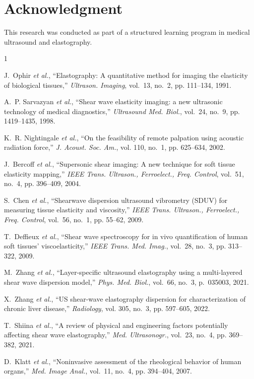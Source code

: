 \documentclass[journal,twoside,a4paper]{IEEEtran}
\begin{document}
\section*{Acknowledgment}

This research was conducted as part of a structured learning program 
in medical ultrasound and elastography.

\begin{thebibliography}{1}

J.~Ophir \textit{et al.}, ``Elastography: A quantitative method for 
imaging the elasticity of biological tissues,'' \emph{Ultrason. Imaging}, 
vol.~13, no.~2, pp. 111--134, 1991.

A.~P. Sarvazyan \textit{et al.}, ``Shear wave elasticity imaging: 
a new ultrasonic technology of medical diagnostics,'' 
\emph{Ultrasound Med. Biol.}, vol.~24, no.~9, pp. 1419--1435, 1998.

K.~R. Nightingale \textit{et al.}, ``On the feasibility of remote 
palpation using acoustic radiation force,'' 
\emph{J. Acoust. Soc. Am.}, vol. 110, no.~1, pp. 625--634, 2002.

J.~Bercoff \textit{et al.}, ``Supersonic shear imaging: A new 
technique for soft tissue elasticity mapping,'' 
\emph{IEEE Trans. Ultrason., Ferroelect., Freq. Control}, 
vol.~51, no.~4, pp. 396--409, 2004.

S.~Chen \textit{et al.}, ``Shearwave dispersion ultrasound vibrometry 
(SDUV) for measuring tissue elasticity and viscosity,'' 
\emph{IEEE Trans. Ultrason., Ferroelect., Freq. Control}, 
vol.~56, no.~1, pp. 55--62, 2009.

T.~Deffieux \textit{et al.}, ``Shear wave spectroscopy for 
in vivo quantification of human soft tissues' viscoelasticity,'' 
\emph{IEEE Trans. Med. Imag.}, vol.~28, no.~3, pp. 313--322, 2009.

M.~Zhang \textit{et al.}, ``Layer-specific ultrasound elastography 
using a multi-layered shear wave dispersion model,'' 
\emph{Phys. Med. Biol.}, vol.~66, no.~3, p.~035003, 2021.

X.~Zhang \textit{et al.}, ``US shear-wave elastography dispersion 
for characterization of chronic liver disease,'' 
\emph{Radiology}, vol. 305, no.~3, pp. 597--605, 2022.

T.~Shiina \textit{et al.}, ``A review of physical and engineering 
factors potentially affecting shear wave elastography,'' 
\emph{Med. Ultrasonogr.}, vol.~23, no.~4, pp. 369--382, 2021.

D.~Klatt \textit{et al.}, ``Noninvasive assessment of the 
rheological behavior of human organs,'' 
\emph{Med. Image Anal.}, vol.~11, no.~4, pp. 394--404, 2007.

\end{thebibliography}
\end{document}
